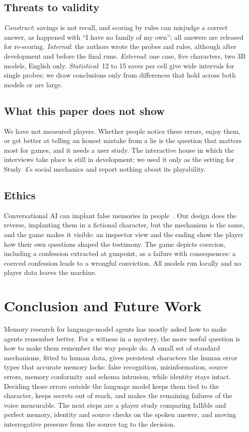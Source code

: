 \documentclass[conference]{IEEEtran}
\begin{document}
\subsection{Threats to validity}
\emph{Construct}: savings is not recall, and scoring by rules can misjudge a correct answer, as
happened with ``I have no family of my own''; all answers are released for re-scoring.
\emph{Internal}: the authors wrote the probes and rules, although after development and before the
final runs. \emph{External}: one case, five characters, two 3B models, English only.
\emph{Statistical}: 12 to 15 saves per cell give wide intervals for single probes; we draw conclusions
only from differences that hold across both models or are large.

\subsection{What this paper does not show}
We have not measured players. Whether people notice these errors, enjoy them, or get better at telling
an honest mistake from a lie is the question that matters most for games, and it needs a user study.
The interactive house in which the interviews take place is still in development; we used it only as
the setting for Study~4's social mechanics and report nothing about its playability.

\subsection{Ethics}
Conversational AI can implant false memories in people~\cite{chan2024falsememories}. Our design does the
reverse, implanting them in a fictional character, but the mechanism is the same, and the game makes it
visible: an inspector view and the ending show the player how their own questions shaped the
testimony. The game depicts coercion, including a confession extracted at gunpoint, as a failure with
consequences: a coerced confession leads to a wrongful conviction. All models run locally and no
player data leaves the machine.

\section{Conclusion and Future Work}
Memory research for language-model agents has mostly asked how to make agents remember better. For a
witness in a mystery, the more useful question is how to make them remember the way people do. A small
set of standard mechanisms, fitted to human data, gives persistent characters the human error types
that accurate memory lacks: false recognition, misinformation, source errors, memory conformity and
schema intrusion, while identity stays intact. Deciding those errors outside the language model keeps
them tied to the character, keeps secrets out of reach, and makes the remaining failures of the
voice measurable. The next steps are a player study comparing fallible and perfect memory, identity
and source checks on the spoken answer, and moving interrogative pressure from the source tag to the
decision.



\end{document}
